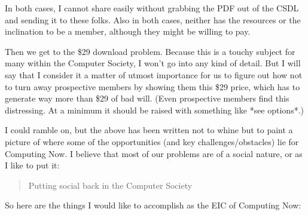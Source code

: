 \documentclass[11pt,english]{luclet}
\begin{document}
In both cases, I cannot share easily without grabbing the PDF out of the CSDL
and sending it to these folks. Also in both cases, neither has the resources
or the inclination to be a member, although they might be willing to pay.

Then we get to the \$29 download problem. Because this is a touchy
subject for many within the Computer Society, I won't go into any kind
of detail. But I will say that I consider it a matter of utmost
importance for us to figure out how not to turn away prospective
members by showing them this \$29 price, which has to generate way more
than \$29 of bad will. (Even prospective members find this
distressing. At a minimum it should be raised with something like *see
options*.)

I could ramble on, but the above has been written not to whine but to
paint a picture of where some of the opportunities (and key
challenges/obstacles) lie for Computing Now. I believe that most of
our problems are of a social nature, or as I like to put it:

\begin{quote}
  Putting social back in the Computer Society
\end{quote}

So here are the things I would like to accomplish as the EIC of Computing Now:
\end{document}
